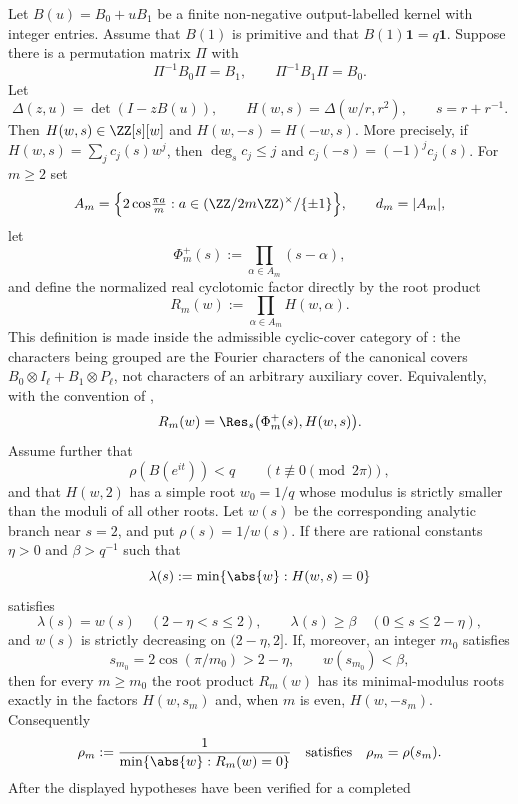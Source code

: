 \begin{theorem}
  \label{thm:self-dual-endpoint-selection}

  Let \(B(u)=B_0+uB_1\) be a finite non-negative output-labelled kernel
  with integer entries. Assume that \(B(1)\) is primitive and that
  \(B(1)\mathbf 1=q\mathbf 1\). Suppose there is a permutation matrix
  \(\Pi\) with
  \[
    \Pi^{-1}B_0\Pi=B_1,\qquad
    \Pi^{-1}B_1\Pi=B_0.
  \]
  Let
  \[
    \Delta(z,u)=\det(I-zB(u)),\qquad
    H(w,s)=\Delta(w/r,r^2),\qquad s=r+r^{-1}.
  \]
  Then \(H(w,s)\in\ZZ[s][w]\) and \(H(w,-s)=H(-w,s)\). More precisely,
  if \(H(w,s)=\sum_j c_j(s)w^j\), then \(\deg_s c_j\le j\) and
  \(c_j(-s)=(-1)^jc_j(s)\).
  For \(m\ge2\)
  set
  \[
    A_m=\Bigl\{2\cos\!\tfrac{\pi a}{m}:
      a\in(\ZZ/2m\ZZ)^\times/\{\pm1\}\Bigr\},
      \qquad d_m=|A_m|,
  \]
  let
  \[
    \Phi_m^+(s):=\prod_{\alpha\in A_m}(s-\alpha),
  \]
  and define the normalized real cyclotomic factor directly by the root
  product
  \[
    R_m(w):=\prod_{\alpha\in A_m}H(w,\alpha).
  \]
  This definition is made inside the admissible cyclic-cover category of
  : the characters being grouped are
  the Fourier characters of the canonical covers
  \(B_0\otimes I_\ell+B_1\otimes P_\ell\), not characters of an arbitrary
  auxiliary cover.
  Equivalently, with the convention of
  ,
  \[
    R_m(w)=\Res_s\bigl(\Phi_m^+(s),H(w,s)\bigr).
  \]
  Assume further that
  \[
    \rho(B(e^{it}))<q
    \qquad (t\not\equiv0\pmod{2\pi}),
  \]
  and that \(H(w,2)\) has a simple root \(w_0=1/q\) whose modulus is
  strictly smaller than the moduli of all other roots. Let
  \(w(s)\) be the corresponding analytic branch near \(s=2\), and put
  \(\rho(s)=1/w(s)\). If there are rational constants
  \(\eta>0\) and \(\beta>q^{-1}\) such that
  \[
    \lambda(s):=\min\{\abs{w}:H(w,s)=0\}
  \]
  satisfies
  \[
    \lambda(s)=w(s)
       \quad (2-\eta<s\le2),
    \qquad
    \lambda(s)\ge \beta
       \quad (0\le s\le 2-\eta),
  \]
  and \(w(s)\) is strictly decreasing on \((2-\eta,2]\). If, moreover,
  an integer \(m_0\) satisfies
  \[
    s_{m_0}=2\cos(\pi/m_0)>2-\eta,
    \qquad
    w(s_{m_0})<\beta,
  \]
  then for every \(m\ge m_0\) the root product \(R_m(w)\) has
  its minimal-modulus roots exactly in the factors \(H(w,s_m)\) and,
  when \(m\) is even, \(H(w,-s_m)\). Consequently
  \[
    \rho_m:=\frac{1}{\min\{\abs{w}:R_m(w)=0\}}
    \quad\text{satisfies}\quad
    \rho_m=\rho(s_m).
  \]
  After the displayed hypotheses have been verified for a completed

\end{theorem}
